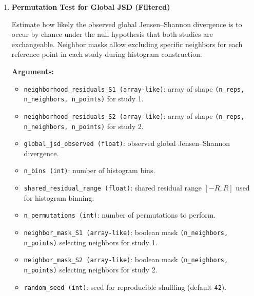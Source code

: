 \begin{enumerate}
        \begin{lstlisting}[language=Python, caption={Permutation Test for Global JSD}]
out = gjct_permutation_test(
    neighborhood_residuals_S1,
    neighborhood_residuals_S2,
    global_jsd_observed,
    n_bins,
    shared_residual_range,
    n_permutations,
    random_seed=42
)

jsd_null = out["jsd_null"]
p_value = out["p_value"]
        \end{lstlisting}

    \item \textbf{Permutation Test for Global JSD (Filtered)}

        Estimate how likely the observed global Jensen–Shannon divergence is to occur by chance under the null hypothesis that both studies are exchangeable.  
        Neighbor masks allow excluding specific neighbors for each reference point in each study during histogram construction.

        \textbf{Arguments:}
        \begin{itemize}
            \item \lstinline!neighborhood_residuals_S1 (array-like)!: array of shape \lstinline!(n_reps, n_neighbors, n_points)! for study 1.
            \item \lstinline!neighborhood_residuals_S2 (array-like)!: array of shape \lstinline!(n_reps, n_neighbors, n_points)! for study 2.
            \item \lstinline!global_jsd_observed (float)!: observed global Jensen–Shannon divergence.
            \item \lstinline!n_bins (int)!: number of histogram bins.
            \item \lstinline!shared_residual_range (float)!: shared residual range \([-R, R]\) used for histogram binning.
            \item \lstinline!n_permutations (int)!: number of permutations to perform.
            \item \lstinline!neighbor_mask_S1 (array-like)!: boolean mask \lstinline!(n_neighbors, n_points)! selecting neighbors for study 1.
            \item \lstinline!neighbor_mask_S2 (array-like)!: boolean mask \lstinline!(n_neighbors, n_points)! selecting neighbors for study 2.
            \item \lstinline!random_seed (int)!: seed for reproducible shuffling (default \lstinline!42!).
        \end{itemize}


\end{enumerate}
